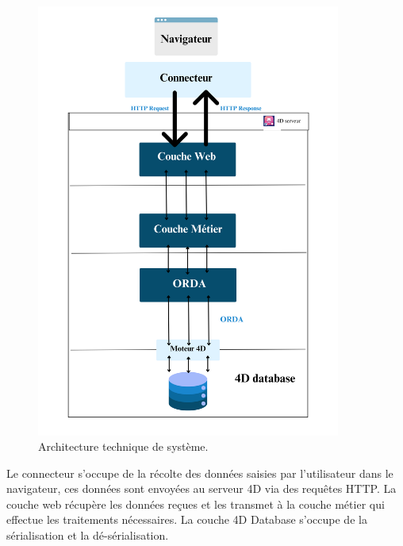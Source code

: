 \begin{figure}[H]
    \centering
    \includegraphics[width=10cm]{Figures/architectureTechnique.png}
    \caption{Architecture technique de système.}
\end{figure}

Le connecteur s’occupe de la récolte des données saisies par l’utilisateur dans le navigateur, ces données sont envoyées au serveur 4D via des requêtes HTTP. La couche web
récupère les données reçues et les transmet à la couche métier qui effectue les traitements
nécessaires. La couche 4D Database s’occupe de la sérialisation et la dé-sérialisation.

